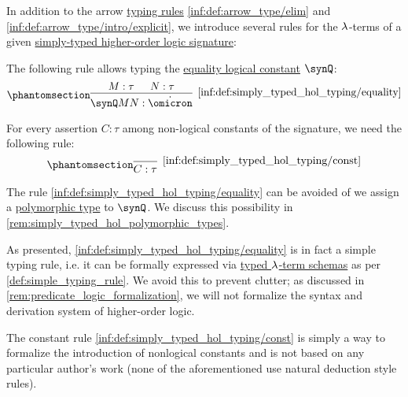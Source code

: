 \begin{definition}\label{def:simply_typed_hol_typing}\mimprovised
  In addition to the arrow \hyperref[con:typing_rule]{typing rules} \ref{inf:def:arrow_type/elim} and \ref{inf:def:arrow_type/intro/explicit}, we introduce several rules for the \( {\mathrm \lambda} \)-terms of a given \hyperref[def:simply_typed_hol_signature]{simply-typed higher-order logic signature}:
  \begin{thmenum}
     The following rule allows typing the \hyperref[def:simply_typed_hol_signature/const]{equality logical constant} \( \synQ \):
    \begin{equation*}\taglabel[\ensuremath{ Q_+ }]{inf:def:simply_typed_hol_typing/equality}
      \begin{prooftree}
        \hypo{ M: \tau }
        \hypo{ N: \tau }
        \infer2[\ref{inf:def:simply_typed_hol_typing/equality}]{ \synQ M N: \syn\omicron }
      \end{prooftree}
    \end{equation*}

     For every assertion \( C: \tau \) among non-logical constants of the signature, we need the following rule:
    \begin{equation*}\taglabel[\ensuremath{ \logic{Ax}_C }]{inf:def:simply_typed_hol_typing/const}
      \begin{prooftree}
        \infer0[\ref{inf:def:simply_typed_hol_typing/const}]{ C: \tau }
      \end{prooftree}
    \end{equation*}
  \end{thmenum}
\end{definition}
\begin{comments}
  \item The rule \ref{inf:def:simply_typed_hol_typing/equality} can be avoided of we assign a \hyperref[def:polymorphic_typed_lambda_calculus]{polymorphic type} to \( \synQ \). We discuss this possibility in \cref{rem:simply_typed_hol_polymorphic_types}.

  \item As presented, \ref{inf:def:simply_typed_hol_typing/equality} is in fact a simple typing rule, i.e. it can be formally expressed via \hyperref[def:lambda_term_schema]{typed \( {\mathrm \lambda} \)-term schemas} as per \cref{def:simple_typing_rule}. We avoid this to prevent clutter; as discussed in \cref{rem:predicate_logic_formalization}, we will not formalize the syntax and derivation system of higher-order logic.

  \item The constant rule \ref{inf:def:simply_typed_hol_typing/const} is simply a way to formalize the introduction of nonlogical constants and is not based on any particular author's work (none of the aforementioned use natural deduction style rules).
\end{comments}

